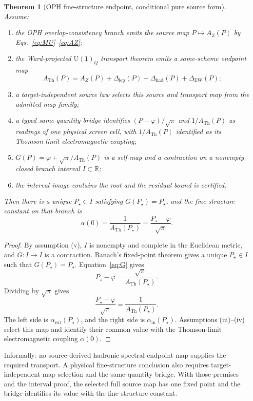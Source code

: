 \documentclass[11pt]{article}
\newtheorem{theorem}{Theorem}
\theoremstyle{remark}
\newcommand{\U}{\mathrm{U}}
\newcommand{\ATh}{A_{\mathrm{Th}}}
\newcommand{\AZ}{A_Z}
\newcommand{\Dlep}{\Delta_{\mathrm{lep}}}
\newcommand{\Dhad}{\Delta_{\mathrm{had}}}
\newcommand{\DEW}{\Delta_{\mathrm{EW}}}
\begin{document}
\begin{theorem}[OPH fine-structure endpoint, conditional pure source form]
Assume:
\begin{enumerate}[label=(\roman*)]
\item the OPH overlap-consistency branch emits the source map \(P\mapsto \AZ(P)\) by Eqs.~\eqref{eq:MU}--\eqref{eq:AZ};
\item the Ward-projected \(\U(1)_Q\) transport theorem emits a same-scheme endpoint map
\[
\ATh(P)=\AZ(P)+\Dlep(P)+\Dhad(P)+\DEW(P);
\]
\item a target-independent source law selects this source and transport map from the admitted map family;
\item a typed same-quantity bridge identifies \((P-\varphi)/\sqrt\pi\) and \(1/\ATh(P)\) as readings of one physical screen cell, with \(1/\ATh(P)\) identified as its Thomson-limit electromagnetic coupling;
\item \(G(P)=\varphi+\sqrt\pi/\ATh(P)\) is a self-map and a contraction on a nonempty closed branch interval \(I\subset\mathbb R\);
\item the interval image contains the root and the residual bound is certified.
\end{enumerate}
Then there is a unique \(P_\star\in I\) satisfying \(G(P_\star)=P_\star\), and the fine-structure constant on that branch is
\[
\alpha(0)=\frac{1}{\ATh(P_\star)}=\frac{P_\star-\varphi}{\sqrt\pi}.
\]
\end{theorem}

\begin{proof}
By assumption (v), \(I\) is nonempty and complete in the Euclidean metric,
and \(G:I\to I\) is a contraction. Banach's fixed-point theorem gives a unique \(P_\star\in I\) such that \(G(P_\star)=P_\star\). Equation~\eqref{eq:G} gives
\[
P_\star-\varphi=\frac{\sqrt\pi}{\ATh(P_\star)}.
\]
Dividing by \(\sqrt\pi\) gives
\[
\frac{P_\star-\varphi}{\sqrt\pi}=\frac{1}{\ATh(P_\star)}.
\]
The left side is \(\alpha_{\mathrm{ext}}(P_\star)\), and the right side is \(\alpha_{\mathrm{in}}(P_\star)\). Assumptions (iii)--(iv) select this map and identify their common value with the Thomson-limit electromagnetic coupling \(\alpha(0)\).
\end{proof}

Informally: no source-derived hadronic spectral endpoint map supplies the required transport. A physical fine-structure conclusion also requires target-independent map selection and the same-quantity bridge. With those premises and the interval proof, the selected full source map has one fixed point and the bridge identifies its value with the fine-structure constant.
\end{document}
